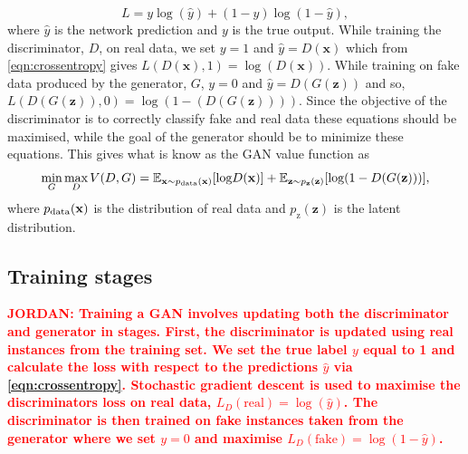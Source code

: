 \documentclass[12pt]{iopart}
\newcommand{\jordan}[1]{\textbf{\textcolor{red}{JORDAN: #1}}}
\begin{document}
%
\begin{equation}
    L = y \log(\hat{y}) + (1 - y) \log(1-\hat{y}),
    \label{eqn:crossentropy}
\end{equation}
where $\hat{y}$ is the network prediction and $y$ is the true output. While training the discriminator, $D$, on real data, we set $y = 1$ and $\hat{y} = D(\mathbf{x})$ which from \cref{eqn:crossentropy} gives $L(D(\mathbf{x}),1) = \log(D(\mathbf{x}))$. While training on fake data produced by the generator, $G$, $y = 0$ and $\hat{y} = D(G(\mathbf{z}))$ and so, $L(D(G(\mathbf{z})),0) = \log(1-(D(G(\mathbf{z}))))$. Since the objective of the discriminator is to correctly classify fake and real data these equations should be maximised, while the goal of the generator should be to minimize these equations. This gives what is know as the \ac{GAN} value function as
%
\begin{equation}
   \mathop{\text{min}}_{G}  \mathop{\text{max}}_{D} V(D,G) = \mathbb{E}_{\mathbf{x} \sim p_{\text{\text{data}}}(\mathbf{x})} [\text{log} D(\mathbf{x})] + \mathbb{E}_{\mathbf{z} \sim p_{\mathbf{z}}(\mathbf{z})} [\text{log}(1-D(G(\mathbf{z})))],
 \label{equation:GANloss}
 \end{equation}
where $p_{\text{\text{data}}}(\mathbf{x})$ is the distribution of real data and $p_{\text{z}}(\mathbf{z})$ is the latent distribution. 

\subsection{Training stages}
%
\jordan{Training a GAN involves updating both the discriminator and generator in stages. First, the discriminator is updated using real instances from the training set. We set the true label $y$ equal to 1 and calculate the loss with respect to the predictions $\hat{y}$ via \cref{eqn:crossentropy}. Stochastic gradient descent is used to maximise the discriminators loss on real data, $L_D(\textrm{real}) = \log(\hat{y})$. The discriminator is then trained on fake instances taken from the generator where we set $y=0$ and maximise $L_D(\textrm{fake}) = \log(1-\hat{y})$.} 
\end{document}
